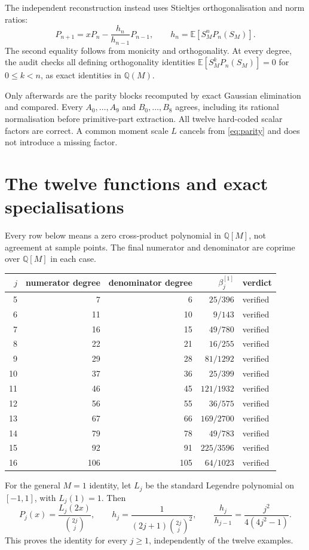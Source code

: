 \documentclass[11pt,a4paper]{article}
\newcommand{\E}{\mathbb E}
\begin{document}
The independent reconstruction instead uses Stieltjes orthogonalisation and norm ratios:
\[
P_{n+1}=xP_n-\frac{h_n}{h_{n-1}}P_{n-1},\qquad
h_n=\E[S_M^nP_n(S_M)].
\]
The second equality follows from monicity and orthogonality. At every degree, the audit checks all defining orthogonality identities
$\E[S_M^kP_n(S_M)]=0$ for $0\leq k<n$, as exact identities in $\mathbb Q(M)$.

Only afterwards are the parity blocks recomputed by exact Gaussian elimination and compared. Every $A_0,\ldots,A_9$ and $B_0,\ldots,B_8$ agrees, including its rational normalisation before primitive-part extraction. All twelve hard-coded scalar factors are correct. A common moment scale $L$ cancels from \eqref{eq:parity} and does not introduce a missing factor.

\section{The twelve functions and exact specialisations}
Every row below means a zero cross-product polynomial in $\mathbb Q[M]$, not agreement at sample points. The final numerator and denominator are coprime over $\mathbb Q[M]$ in each case.
\begin{center}
\begin{tabular}{@{}rrrrl@{}}
\toprule
$j$ & numerator degree & denominator degree & $\beta_j^{[1]}$ & verdict\\
\midrule
5&7&6&$25/396$&verified\\
6&11&10&$9/143$&verified\\
7&16&15&$49/780$&verified\\
8&22&21&$16/255$&verified\\
9&29&28&$81/1292$&verified\\
10&37&36&$25/399$&verified\\
11&46&45&$121/1932$&verified\\
12&56&55&$36/575$&verified\\
13&67&66&$169/2700$&verified\\
14&79&78&$49/783$&verified\\
15&92&91&$225/3596$&verified\\
16&106&105&$64/1023$&verified\\
\bottomrule
\end{tabular}
\end{center}

For the general $M=1$ identity, let $L_j$ be the standard Legendre polynomial on $[-1,1]$, with $L_j(1)=1$. Then
\[
P_j(x)=\frac{L_j(2x)}{\binom{2j}{j}},\qquad
h_j=\frac{1}{(2j+1)\binom{2j}{j}^2},\qquad
\frac{h_j}{h_{j-1}}=\frac{j^2}{4(4j^2-1)}.
\]
This proves the identity for every $j\geq1$, independently of the twelve examples.
\end{document}
